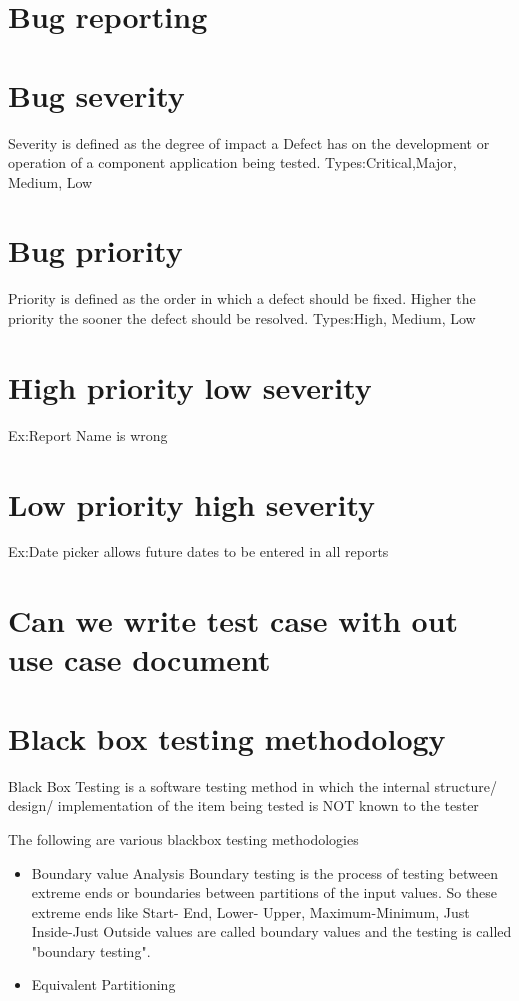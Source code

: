\documentclass[12pt, oneside]{article}
\begin{document}
\section{Bug reporting}

\section{Bug severity}
Severity is defined as the degree of impact a Defect has on the development or operation of a component application being tested.
Types:Critical,Major, Medium, Low

\section{Bug priority}

Priority is defined as the order in which a defect should be fixed. Higher the priority the sooner the defect should be resolved.
Types:High, Medium, Low

\section{High priority low severity}
Ex:Report Name is wrong 

\section{Low priority high severity}
Ex:Date picker allows future dates to be entered in all reports
\section{Can we write test case with out use case document} 


\section{Black box testing methodology}
Black Box Testing is a software testing method in which the internal structure/ design/ implementation of the item being tested is NOT known to the tester

The following are various blackbox testing methodologies

\begin{itemize}
    \item Boundary value Analysis
    \subitem Boundary testing is the process of testing between extreme ends or boundaries between partitions of the input values.
    \subitem So these extreme ends like Start- End, Lower- Upper, Maximum-Minimum, Just Inside-Just Outside values are called boundary values and the testing is called "boundary testing".
    \item Equivalent Partitioning 

\end{itemize}
\end{document}

